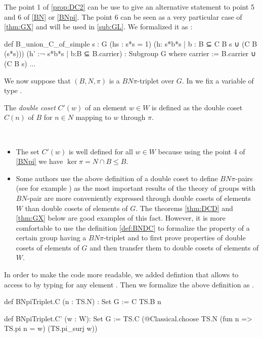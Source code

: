 \begin{remarque}
The point 1 of \ref{prop:DC2} can be use to give an alternative statement to point 5 and 6 of \ref{BN} or \ref{BNpi}. The point $6$ can be seen as a very particular case of \ref{thm:GX} and will be used in \ref{sub:GL}. We formalized it as :
\begin{leancode}
def B_union_C_of_simple {s : G} (hs : s*s = 1) (h: {s*b*s | b : B} ⊆ C B s ∪ (C B (s*s)))
    (h' :¬ {s*b*s | b:B} ⊆ B.carrier) : Subgroup G where
  carrier := B.carrier ∪ (C B s)
  ...
\end{leancode}
\end{remarque}

We now suppose that $\left( B,N, \pi \right)$ is a $BN\pi$-triplet over $G$. In \Lean we fix a variable  of type . 

\begin{definition} \label{def:BNDC}
The \emph{double coset} $C'(w)$ of an element $w\in W$ is defined as the double coset $C(n)$ of $B$ for $n \in N$ mapping to $w$ through $\pi$.
\end{definition}

\begin{remark} \

    \begin{itemize}
        \item The set $C'\left( w \right)$ is well defined for all $w \in W$ because using the point 4 of \ref{BNpi} we have $\ker \pi = N \cap B \le B$.
        \item Some authors use the above definition of a double coset to define $BN\pi$-pairs (see for example \cite{bourbaki_groupes_2007}) as the most important results of the theory of groups with $BN$-pair are more conveniently expressed through double cosets of elements $W$ than double cosets of elements of $G$. The theorems \ref{thm:DCD} and \ref{thm:GX} below are good examples of this fact.
However, it is more comfortable to use the definition \ref{def:BNDC} to formalize the property of a certain group having a $BN\pi$-triplet and to first prove properties of double cosets of elements of $G$ and then transfer them to double cosets of elements of $W$.
\end{itemize}
\end{remark}

In order to make the \Lean code more readable, we added  defintion that allows to access to  by typing  for any element . Then we formalize the above definition as .
\begin{leancode}
def BNpiTriplet.C (n : TS.N) : Set G := C TS.B n

def BNpiTriplet.C' (w : W): Set G := 
  TS.C (@Classical.choose TS.N (fun n => TS.pi n = w) (TS.pi_surj w))
\end{leancode} 

